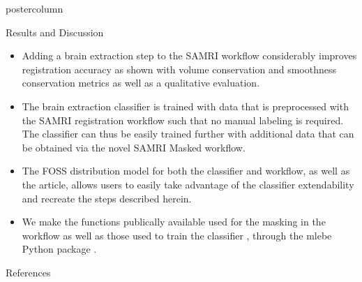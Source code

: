 \begin{frame}
\begin{columns}
\begin{column}{.59\textwidth}
\begin{beamercolorbox}[center]{postercolumn}
\begin{minipage}{.95\textwidth}
{                            \begin{myblock}{Results and Discussion}
                                \begin{itemize}
                                    \item Adding a brain extraction step to the SAMRI workflow considerably improves registration accuracy as shown with volume conservation and smoothness conservation metrics as well as a qualitative evaluation.
                                    \item The brain extraction classifier is trained with data that is preprocessed with the SAMRI registration workflow such that no manual labeling is required.
                                    The classifier can thus be easily trained further with additional data that can be obtained via the novel SAMRI Masked workflow.
                                    \item The FOSS distribution model \cite{repsep} for both the classifier and workflow, as well as the article, allows users to easily take advantage of the classifier extendability and recreate the steps described herein.
                                    \item We make the functions publically available used for the masking in the workflow as well as those used to train the classifier \cite{mlebe_trainingdata}, through the \textcolor{mg}{mlebe} Python package \cite{mlebe}.

                                \end{itemize}
                            \end{myblock}\vfill

                            \begin{myblock}{References}
                                \vspace{-1em}
                                \begin{multicols}{2}
                                    \scriptsize
                                    
                                    
                                \end{multicols}
                                \vspace{-1em}
                            \end{myblock}\vfill


                        }
                    \end{minipage}
                \end{beamercolorbox}
            \end{column}

        \end{columns}
    \end{frame}

